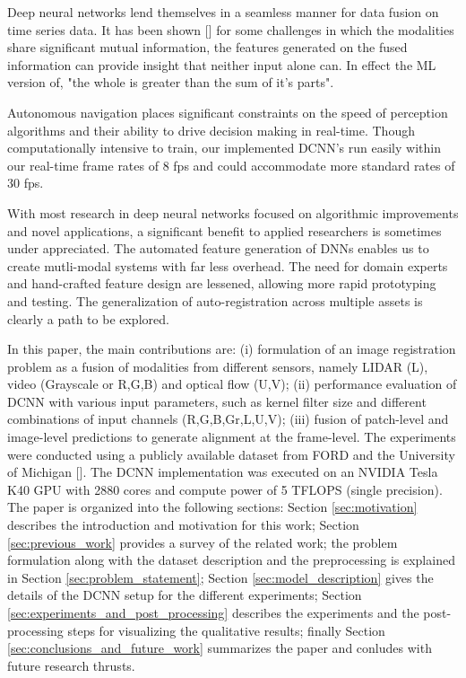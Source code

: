 \documentclass{article}
\begin{document}
Deep neural networks lend themselves in a seamless manner for data fusion on time series data. It has been shown [\cite{Ngiam2011Multimodal}] for some challenges in which the modalities share significant mutual information, the features generated on the fused information can provide insight that neither input alone can. In effect the ML version of, "the whole is greater than the sum of it's parts". 

Autonomous navigation places significant constraints on the speed of perception algorithms and their ability to drive decision making in real-time. Though computationally intensive to train, our implemented DCNN's run easily within our real-time frame rates of 8 fps and could accommodate more standard rates of 30 fps. %

With most research in deep neural networks focused on algorithmic improvements and novel applications, a significant benefit to applied researchers is sometimes under appreciated. The automated feature generation of DNNs enables us to create mutli-modal systems with far less overhead. The need for domain experts and hand-crafted feature design are lessened, allowing more rapid prototyping and testing. The generalization of auto-registration across multiple assets is clearly a path to be explored. 

In this paper, the main contributions are: (i) formulation of an image registration problem as a fusion of modalities from different sensors, namely LIDAR (L), video (Grayscale or R,G,B) and optical flow (U,V); (ii) performance evaluation of DCNN with various input parameters, such as kernel filter size and different combinations of input channels (R,G,B,Gr,L,U,V); (iii) fusion of patch-level and image-level predictions to generate alignment at the frame-level. The experiments were conducted using a publicly available dataset from FORD and the University of Michigan [\cite{Pandey2011Ford-Campu}]. The DCNN implementation was executed on an NVIDIA Tesla K40 GPU with 2880 cores and compute power of 5 TFLOPS (single precision). The paper is organized into the following sections: Section \ref{sec:motivation} describes the introduction and motivation for this work; Section \ref{sec:previous_work} provides a survey of the related work; the problem formulation along with the dataset description and the preprocessing is explained in Section \ref{sec:problem_statement}; Section \ref{sec:model_description} gives the details of the DCNN setup for the different experiments; Section \ref{sec:experiments_and_post_processing} describes the experiments and the post-processing steps for visualizing the qualitative results; finally Section \ref{sec:conclusions_and_future_work} summarizes the paper and conludes with future research thrusts.
\end{document}
